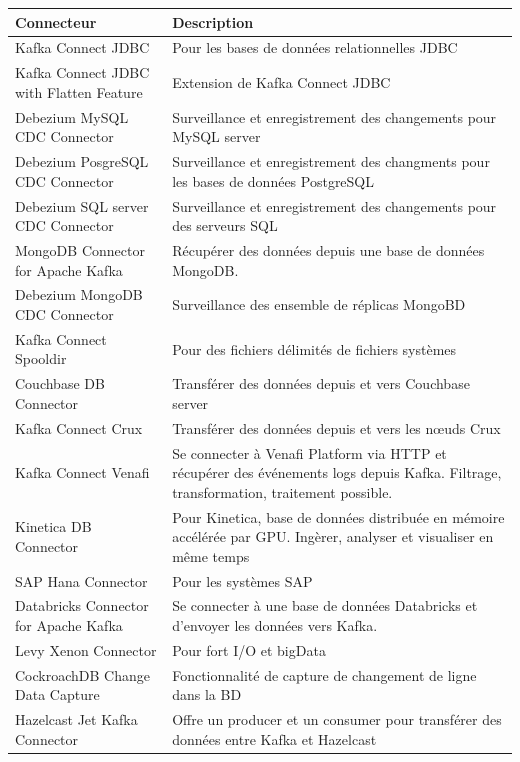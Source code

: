 \documentclass[11pt]{article}
\begin{document}
			\begin{longtable}{|p{7.5cm}|p{7.5cm}|}
				\hline
				\rowcolor{lightgray} Connecteur & Description\\\hline
				\endhead
				Kafka Connect JDBC & Pour les bases de données relationnelles JDBC\\\hline
				Kafka Connect JDBC with Flatten Feature & Extension de Kafka Connect JDBC\\\hline
				Debezium MySQL CDC Connector & Surveillance et enregistrement des changements pour MySQL server\\\hline
				Debezium PosgreSQL CDC Connector & Surveillance et enregistrement des changments pour les bases de données PostgreSQL\\\hline
				Debezium SQL server CDC Connector & Surveillance et enregistrement des changements pour des serveurs SQL\\\hline
				MongoDB Connector for Apache Kafka & Récupérer des données depuis une base de données MongoDB.\\\hline
				Debezium MongoDB CDC Connector & Surveillance des ensemble de réplicas MongoBD\\\hline
				Kafka Connect Spooldir & Pour des fichiers délimités de fichiers systèmes\\\hline
				Couchbase DB Connector & Transférer des données depuis et vers Couchbase server\\\hline
				Kafka Connect Crux & Transférer des données depuis et vers les nœuds Crux\\\hline
				Kafka Connect Venafi & Se connecter à Venafi Platform via HTTP et récupérer des événements logs depuis Kafka. Filtrage, transformation, traitement possible.\\\hline
				Kinetica DB Connector & Pour Kinetica, base de données distribuée en mémoire accélérée par GPU. Ingèrer, analyser et visualiser en même temps\\\hline
				SAP Hana Connector & Pour les systèmes SAP\\\hline
				Databricks Connector for Apache Kafka & Se connecter à une base de données Databricks et d'envoyer les données vers Kafka.\\\hline
				Levy Xenon Connector & Pour fort I/O et bigData\\\hline
				CockroachDB Change Data Capture & Fonctionnalité de capture de changement de ligne dans la BD\\\hline
				Hazelcast Jet Kafka Connector & Offre un producer et un consumer pour transférer des données entre Kafka et Hazelcast\\\hline

\end{longtable}
\end{document}
